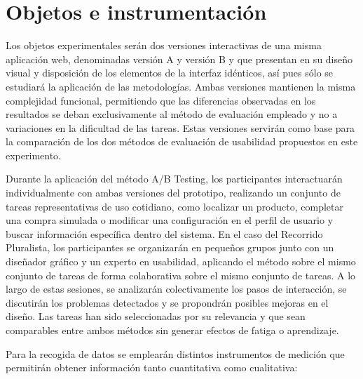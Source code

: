 \documentclass[a4paper,12pt]{report}
\begin{document}
\section{Objetos e instrumentación}

Los objetos experimentales serán dos versiones interactivas de una misma aplicación web, denominadas versión A y versión B y que presentan en su diseño visual y 
disposición de los elementos de la interfaz idénticos, así pues sólo se estudiará la aplicación de las metodologías. Ambas versiones mantienen la misma complejidad funcional, permitiendo que las diferencias observadas en los resultados se deban exclusivamente al método 
de evaluación empleado y no a variaciones en la dificultad de las tareas. Estas versiones servirán como base para la comparación de los dos métodos de evaluación de usabilidad propuestos en este experimento.

Durante la aplicación del método A/B Testing, los participantes interactuarán individualmente con ambas versiones del prototipo, 
realizando un conjunto de tareas representativas de uso cotidiano, como localizar un producto, completar una compra simulada o modificar una 
configuración en el perfil de usuario y buscar información específica dentro del sistema. En el caso del Recorrido Pluralista, los 
participantes se organizarán en pequeños grupos junto con un diseñador gráfico y un experto en usabilidad, aplicando el método 
sobre el mismo conjunto de tareas de forma colaborativa sobre el mismo conjunto de tareas. A lo largo de estas sesiones, se analizarán colectivamente 
los pasos de interacción, se discutirán los problemas detectados y se propondrán posibles mejoras en el diseño. Las tareas han sido seleccionadas por su 
relevancia y que sean comparables entre ambos métodos sin generar efectos de fatiga o aprendizaje. 


Para la recogida de datos se emplearán distintos instrumentos de medición que permitirán obtener información tanto cuantitativa como cualitativa: 
\end{document}

